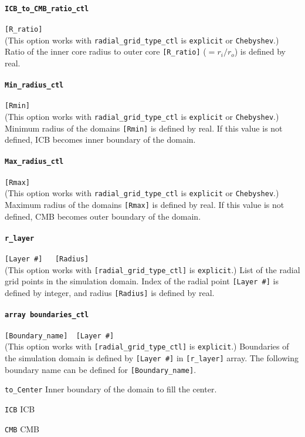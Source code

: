 \paragraph{\tt ICB\_to\_CMB\_ratio\_ctl}
\label{href_t:ICB_to_CMB_ratio_ctl} 
\verb|[R_ratio]| \\
(This option works with \verb|radial_grid_type_ctl| is {\tt explicit} or {\tt Chebyshev}.)
Ratio of the inner core radius to outer core \verb|[R_ratio]| ($ = r_{i} / r_{o}$) is defined by real.

\paragraph{\tt Min\_radius\_ctl}
\label{href_t:Min_radius_ctl}
\verb|[Rmin]| \\
(This option works with \verb|radial_grid_type_ctl| is {\tt explicit} or {\tt Chebyshev}.)
Minimum radius of the domains \verb|[Rmin]| is defined by real. If this value is not defined, ICB becomes inner boundary of the domain.

\paragraph{\tt Max\_radius\_ctl }
\label{href_t:Max_radius_ctl} 
\verb|[Rmax]| \\
(This option works with \verb|radial_grid_type_ctl| is {\tt explicit} or {\tt Chebyshev}.)
Maximum radius of the domains \verb|[Rmax]| is defined by real. If this value is not defined, CMB becomes outer boundary of the domain.

\paragraph{\tt r\_layer}
\label{href_t:r_layer}
\verb|[Layer #]   [Radius]| \\
(This option works with \verb|[radial_grid_type_ctl]| is {\tt explicit}.)
List of the radial grid points in the simulation domain. Index of the radial point \verb|[Layer #]| is defined by integer, and radius \verb|[Radius]| is defined by real.

\paragraph{\tt array boundaries\_ctl}
\verb|[Boundary_name]  [Layer #]| \\
\label{href_t:boundaries_ctl} 
(This option works with \verb|[radial_grid_type_ctl]| is {\tt explicit}.)
Boundaries of the simulation domain is defined by \verb|[Layer #]| in \verb|[r_layer]| array. The following boundary name can be defined for \verb|[Boundary_name]|.
%
\begin{description}
	\item{\tt to\_Center} Inner boundary of the domain to fill the center.
	\item{\tt ICB} ICB
	\item{\tt CMB} CMB
\end{description}
%

